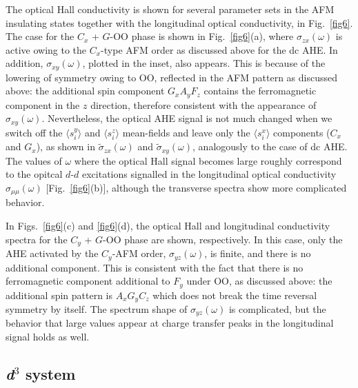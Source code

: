 \documentclass[aps,twocolumn,prb,preprintnumbers,amsmath,amssymb]{revtex4-2}
\begin{document}
The optical Hall conductivity is shown for several parameter sets 
 in the AFM insulating states together with the longitudinal optical conductivity, 
  in Fig.~\ref{fig6}. 
The case for the $C_x$ + $G$-OO phase is shown in Fig.~\ref{fig6}(a), 
 where $\sigma_{zx}(\omega)$ is active owing to the $C_x$-type AFM order as discussed above for the dc AHE. 
In addition, $\sigma_{xy}(\omega)$, plotted in the inset, also appears.  
This is because of the lowering of symmetry owing to OO, reflected in the AFM pattern as discussed above: 
 the additional spin component $G_x A_y F_z$ contains the ferromagnetic component in the $z$ direction, 
 therefore consistent with the appearance of $\sigma_{xy}(\omega)$. 
Nevertheless, the optical AHE signal is not much changed when we switch off the $\langle s_i^y \rangle$ and $\langle s_i^z \rangle$ mean-fields and leave only the $\langle s_i^x \rangle$ components ($C_x$ and $G_x$), 
 as shown in $\tilde{\sigma}_{zx}(\omega)$ and $\tilde{\sigma}_{xy}(\omega)$, analogously to the case of dc AHE. 
The values of $\omega$ where the optical Hall signal becomes large roughly correspond to the opitcal $d$-$d$ excitations 
 signalled in the longitudinal optical conductivity $\sigma_{\mu\mu}(\omega)$ [Fig.~\ref{fig6}(b)], 
 although the transverse spectra show more complicated behavior. 
 
In Figs.~\ref{fig6}(c) and \ref{fig6}(d), the optical Hall and longitudinal conductivity spectra for the $C_y$ + $G$-OO phase are shown, respectively.
In this case, only the AHE activated by the $C_y$-AFM order, $\sigma_{yz}(\omega)$, is finite,  
 and there is no additional component. 
This is consistent with the fact that there is no ferromagnetic component additional to $F_y$ under OO, 
 as discussed above: the additional spin pattern is $A_x G_y C_z$ which does not break the time reversal symmetry by itself. 
The spectrum shape of $\sigma_{yz}(\omega)$ is complicated, 
 but the behavior that large values appear at charge transfer peaks in the longitudinal signal holds as well. 

\subsection{\textit{\textbf{d}}$^3$ system}\label{d3}
\end{document}
